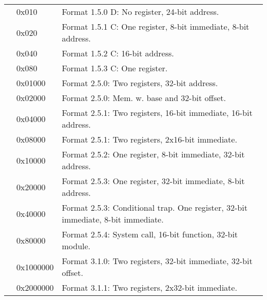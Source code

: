 \documentclass[forwardcom.tex]{subfiles}
\begin{document}
\begin{longtable} {|p{18mm}|p{20mm} p{80mm}|}
  &  0x010 & Format 1.5.0 D: No register, 24-bit address. \\  
  &  0x020 & Format 1.5.1 C: One register, 8-bit immediate, 8-bit address. \\
  &  0x040 & Format 1.5.2 C: 16-bit address. \\
  &  0x080 & Format 1.5.3 C: One register. \\
  
  &  0x01000 & Format 2.5.0: Two registers, 32-bit address. \\
  &  0x02000 & Format 2.5.0: Mem. w. base and 32-bit offset. \\
  &  0x04000 & Format 2.5.1: Two registers, 16-bit immediate, 16-bit address. \\
  &  0x08000 & Format 2.5.1: Two registers, 2x16-bit immediate. \\

  &  0x10000 & Format 2.5.2: One register, 8-bit immediate, 32-bit address. \\
  &  0x20000 & Format 2.5.3: One register, 32-bit immediate, 8-bit address. \\
  &  0x40000 & Format 2.5.3: Conditional trap. One register, 32-bit immediate, 8-bit immediate. \\  
  &  0x80000 & Format 2.5.4: System call, 16-bit function, 32-bit module. \\
  
  & 0x1000000 & Format 3.1.0: Two registers, 32-bit immediate, 32-bit offset. \\
  & 0x2000000 & Format 3.1.1: Two registers, 2x32-bit immediate. \\
\hline
\end{longtable}
\end{document}
